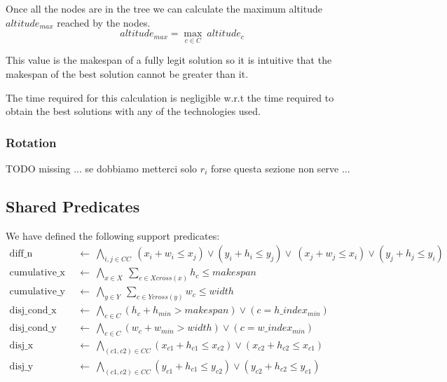         Once all the nodes are in the tree we can calculate the maximum altitude $altitude_{max}$ reached by the nodes.
        \begin{equation}
            altitude_{max} = \max_{c \in C}\  altitude_c
        \end{equation}

        This value is the makespan of a fully legit solution so it is intuitive that the makespan of the best solution cannot
        be greater than it. 
        
        The time required for this calculation is negligible w.r.t the time required to obtain the best solutions with any 
        of the technologies used.

    \subsubsection{Rotation}
        \colorbox{BurntOrange}{TODO missing ... se dobbiamo metterci solo $r_i$ forse questa sezione non serve ...}




\subsection{Shared Predicates} \label{sec:shared_predicates}
    We have defined the following support predicates:
    \begin{align}
              \text{diff\_n}\ &\ \leftarrow\ \bigwedge_{i,j \in CC}\ (x_i + w_i \leq x_j) \lor (y_i + h_i \leq y_j) \lor\ (x_j + w_j \leq x_i) \lor (y_j + h_j \leq y_i) \label{eq:diffn}        \\
        \text{cumulative\_x}\ &\ \leftarrow\ \bigwedge_{x \in X}\ \sum_{c \in Xcross(x)} h_c \leq makespan                                                               \label{eq:cumulative_x} \\
        \text{cumulative\_y}\ &\ \leftarrow\ \bigwedge_{y \in Y}\ \sum_{c \in Ycross(y)} w_c \leq width                                                                  \label{eq:cumulative_y} \\
        \text{disj\_cond\_x}\ &\ \leftarrow\ \bigwedge_{c \in C} (h_c + h_{min} > makespan) \lor (c = h\_index_{min})                                                    \nonumber \\
        \text{disj\_cond\_y}\ &\ \leftarrow\ \bigwedge_{c \in C} (w_c + w_{min} > width) \lor (c = w\_index_{min})                                                       \nonumber \\
              \text{disj\_x}\ &\ \leftarrow\ \bigwedge_{(c1,c2) \in CC} (x_{c1} + h_{c1} \leq x_{c2}) \lor (x_{c2} + h_{c2} \leq x_{c1})                                 \nonumber \\
              \text{disj\_y}\ &\ \leftarrow\ \bigwedge_{(c1,c2) \in CC} (y_{c1} + h_{c1} \leq y_{c2}) \lor (y_{c2} + h_{c2} \leq y_{c1})                                 \nonumber
    \end{align}



